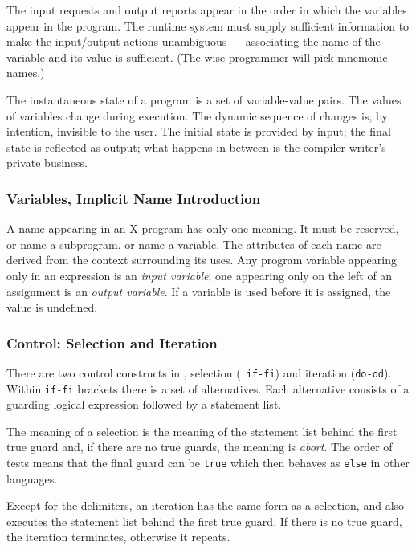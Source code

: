 The input requests and output reports appear in the order in which the 
variables appear in the program.  The runtime system must supply sufficient 
information to make the input/output actions unambiguous
--- associating the name of the variable and its value is sufficient.
(The wise programmer will pick mnemonic names.)

The instantaneous state of a program is a set of variable-value pairs.
The values of variables change during execution.  
The dynamic sequence of changes is, by intention, invisible to the user.  
The initial state is provided by input; the final state is reflected as 
output; what happens in between is the compiler writer's private business.

\subsubsection{Variables, Implicit Name Introduction}

A name appearing in an X program has only one meaning.  It must be reserved, 
or name a subprogram, or name a variable.  The attributes of each name
are derived from the context surrounding its uses.
Any program variable appearing only in an expression is an 
{\em input variable}; 
one appearing only on the left of an assignment is an {\em output variable}. 
If a variable is used before it is assigned, 
the value is undefined.

\subsubsection{Control: Selection and Iteration}

There are two control constructs in , selection (\mbox{\tt
if-fi}) and iteration (\mbox{\tt do-od}).  
Within \mbox{\tt if-fi} brackets there is a set of alternatives.  
Each alternative consists of a guarding logical expression followed by a 
statement list.

The meaning of a selection is the meaning of the statement list behind 
the first true guard and, if there are no true guards, 
the meaning is {\em abort}. 
The order of tests means that the final guard can be {\tt true}
which then behaves as {\tt else} in other languages.

Except for the delimiters, an iteration has the same form as a selection, 
and also executes the statement list behind the first true guard.  
If there is no true guard, the iteration terminates, otherwise it repeats.

